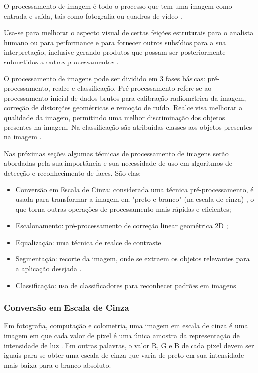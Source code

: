 O processamento de imagem é todo o processo que tem uma imagem como entrada e saída, tais como fotografia ou quadros de vídeo \cite{inpe_proc_img}. 

Usa-se para melhorar o aspecto visual de certas feições estruturais para o analista humano ou para performance e para fornecer outros subsídios para a sua interpretação, inclusive gerando produtos que possam ser posteriormente submetidos a outros processamentos \cite{inpe_proc_img}.

O processamento de imagens pode ser dividido em 3 fases básicas: pré-processamento, realce e classificação.
Pré-processamento refere-se ao processamento inicial de dados brutos para calibração radiométrica da imagem, correção de distorções geométricas e remoção de ruído.
Realce visa melhorar a qualidade da imagem, permitindo uma melhor discriminação dos objetos presentes na imagem.
Na classificação são atribuídas classes aos objetos presentes na imagem \cite{inpe_proc_img}.

Nas próximas seções algumas técnicas de processamento de imagens serão abordadas pela sua importância e sua necessidade de uso em algoritmos de detecção e reconhecimento de faces. São elas:

\begin{itemize}
	\item Conversão em Escala de Cinza: considerada uma técnica pré-processamento, é usada para transformar a imagem em "preto e branco" (na escala de cinza) , o que torna outras operações de processamento mais rápidas e eficientes;
	\item Escalonamento: pré-processamento de correção linear geométrica 2D \cite{lapix_escala};
	\item Equalização: uma técnica de realce de contraste \cite{gonzalez_woods}
	\item Segmentação: recorte da imagem, onde se extraem os objetos relevantes para a aplicação desejada \cite{inpe_proc_img}.
	\item Classificação: uso de classificadores para reconhecer padrões em imagens \cite{drmathew_java_programming}
\end{itemize}

\subsubsection{Conversão em Escala de Cinza}\label{subsubsec:filtros}

Em fotografia, computação e colometria, uma imagem em escala de cinza é uma imagem em que cada valor de pixel é uma única amostra da representação de intensidade de luz \cite{stephen_greyscale}. Em outras palavras, o valor R, G e B de cada pixel devem ser iguais para se obter uma escala de cinza que varia de preto em sua intensidade mais baixa para o branco absoluto.

